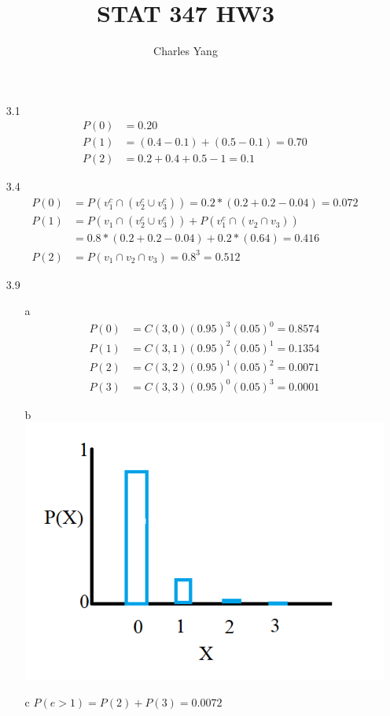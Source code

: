 \documentclass[11pt]{article}
\title{STAT 347 HW3}
\author{Charles Yang}
\begin{document}
    \maketitle

    \begin{enumerate}

        \item[3.1]
        \begin{align*}
            P(0) &= 0.20 \\
            P(1) &= (0.4 - 0.1) + (0.5 - 0.1) = 0.70 \\
            P(2) &= 0.2 + 0.4 + 0.5 - 1 = 0.1
        \end{align*}

        \item[3.4]
        \begin{align*}
            P(0) &= P(v_1^c \cap (v_2^c \cup v_3^c)) = 0.2 * (0.2 + 0.2 - 0.04) = 0.072\\
            P(1) &= P(v_1 \cap (v_2^c \cup v_3^c)) + P(v_1^c \cap (v_2 \cap v_3)) \\
            &= 0.8 * (0.2 + 0.2 - 0.04) + 0.2 * (0.64) = 0.416 \\
            P(2) &= P(v_1 \cap v_2 \cap v_3) = 0.8^3 = 0.512
        \end{align*}

        \item[3.9]
        \begin{enumerate}
            \item[a]
            \begin{align*}
                P(0) &= C(3, 0)(0.95)^3(0.05)^0 = 0.8574 \\
                P(1) &= C(3, 1)(0.95)^2(0.05)^1 = 0.1354\\
                P(2) &= C(3, 2)(0.95)^1(0.05)^2 = 0.0071 \\
                P(3) &= C(3, 3)(0.95)^0(0.05)^3 = 0.0001
            \end{align*}
            \item[b]
            \includegraphics{3.9b.png}
            \newpage
            \item[c] $P(e > 1) = P(2) + P(3) = 0.0072$
        \end{enumerate}


\end{enumerate}
\end{document}
